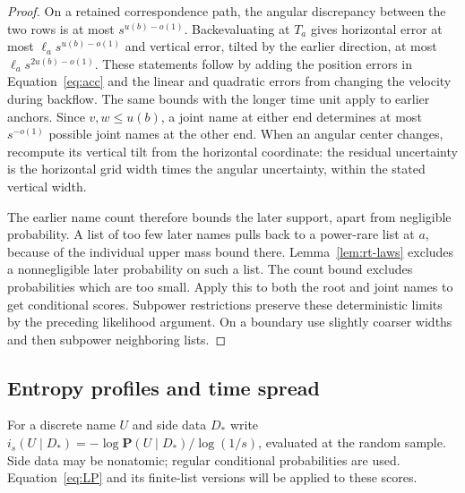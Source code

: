 \begin{proof}
On a retained correspondence path, the angular discrepancy between
the two rows is at most $s^{u(b)-o(1)}$.  Backevaluating at $T_a$
gives horizontal error at most $\ell_as^{u(b)-o(1)}$ and vertical
error, tilted by the earlier direction, at most
$\ell_as^{2u(b)-o(1)}$.  These statements follow by adding the
position errors in Equation~\eqref{eq:acc} and the linear and
quadratic errors from changing the velocity during backflow.
The same bounds with the longer time unit apply to earlier anchors.
Since $v,w\le u(b)$, a joint name at either end determines at most
$s^{-o(1)}$ possible joint names at the other end.  When an angular
center changes, recompute its vertical tilt from the horizontal
coordinate: the residual uncertainty is the horizontal grid width
times the angular uncertainty, within the stated vertical width.

The earlier name count therefore bounds the later support, apart
from negligible probability.  A list of too few later names pulls
back to a power-rare list at $a$, because of the individual upper
mass bound there.  Lemma~\ref{lem:rt-laws} excludes a nonnegligible
later probability on such a list.  The count bound excludes
probabilities which are too small.  Apply this to both the root
and joint names to get conditional scores.  Subpower restrictions
preserve these deterministic limits by the preceding likelihood
argument.  On a boundary use slightly coarser widths and then
subpower neighboring lists.
\end{proof}

\subsection{Entropy profiles and time spread}

For a discrete name $U$ and side data $D_*$ write
$i_s(U\mid D_*)=-\log\mathbf P(U\mid D_*)/\log(1/s)$,
evaluated at the random sample.  Side data may be nonatomic; regular
conditional probabilities are used.  Equation~\eqref{eq:LP} and its
finite-list versions will be applied to these scores.

